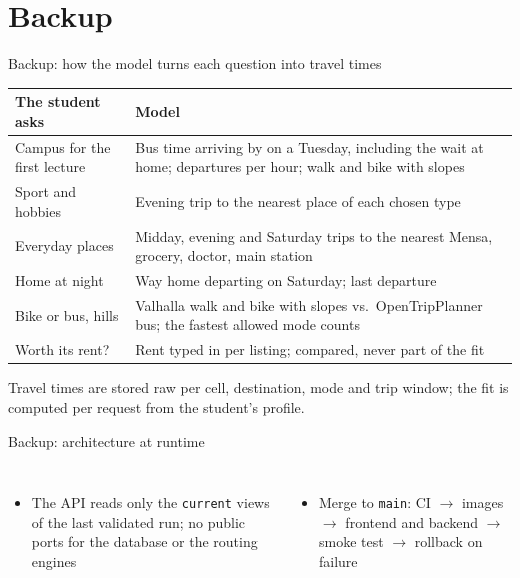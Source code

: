 \documentclass[aspectratio=169,10pt]{beamer}
\begin{document}
\backupslides
\section*{Backup}

\begin{frame}{Backup: how the model turns each question into travel times}
  \footnotesize
  \renewcommand{\arraystretch}{1.2}
  \begin{tabular}{@{}>{\raggedright\arraybackslash}p{48mm}>{\raggedright\arraybackslash}p{88mm}@{}}
    \toprule
    \textbf{The student asks} & \textbf{Model} \\
    \midrule
    Campus for the first lecture & Bus time arriving by \factMorningArrive{} on a Tuesday, including
      the wait at home; departures per hour; walk and bike with slopes \\
    Sport and hobbies & Evening trip to the nearest place of each chosen type \\
    Everyday places & Midday, evening and Saturday trips to the nearest Mensa, grocery, doctor,
      main station \\
    Home at night & Way home departing \factNightDepart{} on Saturday; last departure \\
    Bike or bus, hills & Valhalla walk and bike with slopes vs.\ OpenTripPlanner bus; the
      fastest allowed mode counts \\
    Worth its rent? & Rent typed in per listing; compared, never part of the fit \\
    \bottomrule
  \end{tabular}\par\medskip
  Travel times are stored raw per cell, destination, mode and trip window; the fit is computed
  per request from the student's profile.
\end{frame}

\begin{frame}{Backup: architecture at runtime}
  \centering\architecturefigure\par
  \vspace{3mm}
  \begin{columns}[T,onlytextwidth]
      \begin{itemize}\footnotesize
        \item The API reads only the \texttt{current} views of the last validated run; no
              public ports for the database or the routing engines
      \end{itemize}
      \begin{itemize}\footnotesize
        \item Merge to \texttt{main}: CI $\rightarrow$ images $\rightarrow$ frontend and backend
              $\rightarrow$ smoke test $\rightarrow$ rollback on failure
      \end{itemize}
  \end{columns}
\end{frame}
\end{document}

